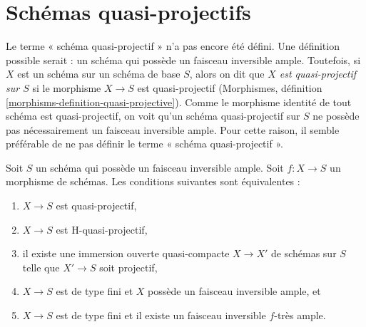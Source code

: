 \section{Schémas quasi-projectifs}
\label{section-quasi-projective}

\noindent
Le terme « schéma quasi-projectif » n'a pas encore été défini.
Une définition possible serait : un schéma qui possède un faisceau inversible
ample. Toutefois, si $X$ est un schéma sur un schéma de base $S$, alors
on dit que {\it $X$ est quasi-projectif sur $S$} si le morphisme
$X \to S$ est quasi-projectif
(Morphismes, définition \ref{morphisms-definition-quasi-projective}).
Comme le morphisme identité de tout schéma est quasi-projectif, on
voit qu'un schéma quasi-projectif sur $S$ ne possède pas nécessairement
un faisceau inversible ample. Pour cette raison, il semble préférable de
ne pas définir le terme « schéma quasi-projectif ».

\begin{lemma}
\label{lemma-quasi-projective}
Soit $S$ un schéma qui possède un faisceau inversible ample.
Soit $f : X \to S$ un morphisme de schémas. Les conditions suivantes sont
équivalentes :
\begin{enumerate}
\item $X \to S$ est quasi-projectif,
\item $X \to S$ est H-quasi-projectif,
\item il existe une immersion ouverte quasi-compacte $X \to X'$ de schémas
sur $S$ telle que $X' \to S$ soit projectif,
\item $X \to S$ est de type fini et $X$ possède un faisceau inversible
ample, et
\item $X \to S$ est de type fini et il existe un
faisceau inversible $f$-très ample.
\end{enumerate}
\end{lemma}

